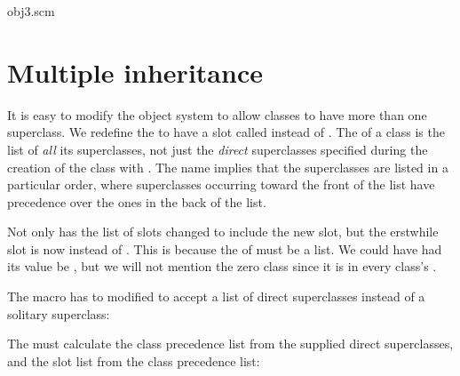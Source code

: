 \scmfilename obj3.scm



\section{Multiple inheritance}

It is easy to modify the object system to allow classes
to have more than one superclass.  We redefine the
  to have a slot called
 instead of .
The  of a class is the list of
{\em all} its superclasses, not just the {\em direct}
superclasses specified during the creation of the class
with .  The name implies that the
superclasses are listed in a particular order, where
superclasses occurring toward the front of the list
have precedence over the ones in the back of the list.



\n Not only has the list of slots changed to include
the new slot, but the erstwhile  slot is
now \q{()} instead of .  This is because the
 of  must be
a list.  We could have had its value be , but
we will not mention the zero class since it is in every
class's .

The  macro has to modified to accept
a list of direct superclasses instead of a solitary superclass:


The  must calculate the class precedence list from
the supplied direct superclasses, and the slot list from the
class precedence list:

